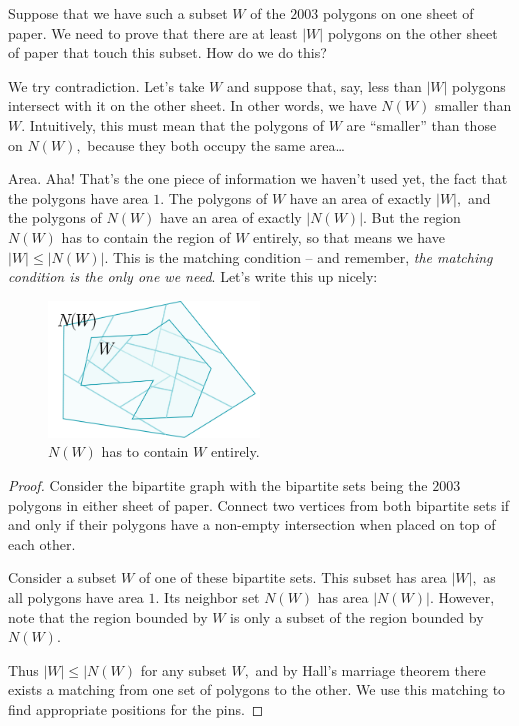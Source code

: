 \documentclass[11pt,paper=letter]{scrartcl}
\begin{document}
Suppose that we have such a subset $W$ of the $2003$ polygons on one sheet of paper. We need to prove that there are at least $|W|$ polygons on the other sheet of paper that touch this subset. How do we do this?

We try contradiction. Let's take $W$ and suppose that, say, less than $|W|$ polygons intersect with it on the other sheet. In other words, we have $N(W)$ smaller than $W$. Intuitively, this must mean that the polygons of $W$ are ``smaller'' than those on $N(W),$ because they both occupy the same area\dots

Area. Aha! That's the one piece of information we haven't used yet, the fact that the polygons have area $1$. The polygons of $W$ have an area of exactly $|W|,$ and the polygons of $N(W)$ have an area of exactly $|N(W)|.$ But the region $N(W)$ has to contain the region of $W$ entirely, so that means we have $|W| \leq |N(W)|.$ This is the matching condition -- and remember, \emph{the matching condition is the only one we need}. Let's write this up nicely:

\begin{figure}
  \centering
  \includegraphics[width=0.5\textwidth]{figure8.png}
  \caption{$N(W)$ has to contain $W$ entirely.}
\end{figure}

\begin{proof}
  Consider the bipartite graph with the bipartite sets being the $2003$ polygons in either sheet of paper. Connect two vertices from both bipartite sets if and only if their polygons have a non-empty intersection when placed on top of each other.

  Consider a subset $W$ of one of these bipartite sets. This subset has area $|W|,$ as all polygons have area $1.$ Its neighbor set $N(W)$ has area $|N(W)|.$ However, note that the region bounded by $W$ is only a subset of the region bounded by $N(W).$

  Thus $|W| \leq |N(W)$ for any subset $W,$ and by Hall's marriage theorem there exists a matching from one set of polygons to the other. We use this matching to find appropriate positions for the pins.
\end{proof}
\end{document}
